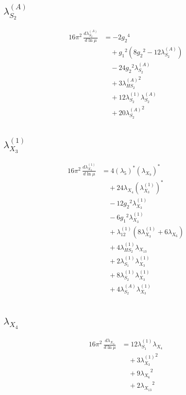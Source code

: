 \documentclass[10pt,a4paper]{article}
\begin{document}
\subsection*{$\lambda_{S_2}^{(A)}$}
\begin{align*}
16\pi^2\,\frac{d \lambda_{S_2}^{(A)}}{d\ln\mu} &=-2 {g_2}^4 \\
&\quad +{g_1}^2 \left(8 {g_2}^2-12 {\lambda_{S_2}^{(A)}}\right) \\
&\quad -24 {g_2}^2 {\lambda_{S_2}^{(A)}} \\
&\quad +3 {\lambda_{HS_2}^{(A)}}^2 \\
&\quad +12 {\lambda_{S_2}^{(1)}} {\lambda_{S_2}^{(A)}} \\
&\quad +20 {\lambda_{S_2}^{(A)}}^2 \\
\end{align*}
\subsection*{$\lambda_{X_{3}}^{(1)}$}
\begin{align*}
16\pi^2\,\frac{d \lambda_{X_{3}}^{(1)}}{d\ln\mu} &=4 \left({\lambda_5}\right)^{*} \left({\lambda_{X_{9}}}\right)^{*} \\
&\quad +24 {\lambda_{X_{4}}} \left({\lambda_{X_{3}}^{(1)}}\right)^{*} \\
&\quad -12 {g_2}^2 {\lambda_{X_{3}}^{(1)}} \\
&\quad -6 {g_1}^2 {\lambda_{X_{3}}^{(1)}} \\
&\quad +{\lambda_{12}^{(1)}} (8 {\lambda_{X_{3}}^{(1)}}+6 {\lambda_{X_{6}}}) \\
&\quad +4 {\lambda_{HS_2}^{(1)}} {\lambda_{X_{13}}} \\
&\quad +2 {\lambda_{S_1}^{(1)}} {\lambda_{X_{3}}^{(1)}} \\
&\quad +8 {\lambda_{S_2}^{(1)}} {\lambda_{X_{3}}^{(1)}} \\
&\quad +4 {\lambda_{S_2}^{(A)}} {\lambda_{X_{3}}^{(1)}} \\
\end{align*}
\subsection*{$\lambda_{X_{4}}$}
\begin{align*}
16\pi^2\,\frac{d \lambda_{X_{4}}}{d\ln\mu} &=12 {\lambda_{S_1}^{(1)}} {\lambda_{X_{4}}} \\
&\quad +3 {\lambda_{X_{3}}^{(1)}}^2 \\
&\quad +9 {\lambda_{X_{6}}}^2 \\
&\quad +2 {\lambda_{X_{13}}}^2 \\
\end{align*}
\end{document}
